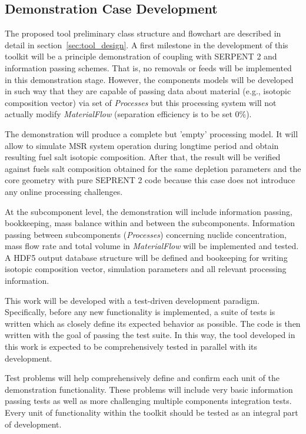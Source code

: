 \subsection{Demonstration Case Development}
The proposed tool preliminary class structure and flowchart are 
described in detail in section~\ref{sec:tool_design}.
A first milestone in the development of this toolkit will be a 
principle demonstration of coupling with SERPENT 2 and 
information passing schemes. That is, no removals or feeds 
will be implemented in this demonstration stage. However, 
the components models will be developed in such way that 
they are capable of passing data about material (e.g., isotopic 
composition vector) via set of \textit{Processes} but this 
processing system will not actually modify \textit{MaterialFlow} 
(separation efficiency is to be set 0\%).

The demonstration will produce a complete but 'empty' processing 
model. It will allow to simulate \gls{MSR} system operation during 
longtime period and obtain resulting fuel salt isotopic composition. 
After that, the result will be verified against fuels salt 
composition obtained for the same depletion parameters and the 
core geometry with pure SEPRENT 2 code because this case does not 
introduce any online processing challenges.

At the subcomponent level, the demonstration will include information 
passing, bookkeeping, mass balance within and between the 
subcomponents. Information passing between subcomponents 
(\textit{Processes}) concerning nuclide concentration, mass flow rate 
and total volume in \textit{MaterialFlow} will be implemented and tested. 
A HDF5 output database structure will be defined and 
bookeeping for writing isotopic composition vector, simulation 
parameters and all relevant processing information.

This work will be developed with a test-driven development paradigm. 
Specifically, before any new functionality is implemented, a suite of 
tests is written which as closely define its expected behavior as 
possible. The code is then written with the goal of passing the test 
suite. In this way, the tool developed in this work is expected to be
comprehensively tested in parallel with its development.

Test problems will help comprehensively define and confirm each unit 
of the demonstration functionality. These problems will include very 
basic information passing tests as well as more challenging multiple 
components integration tests. Every unit of functionality
within the toolkit should be tested as an integral part of development.

